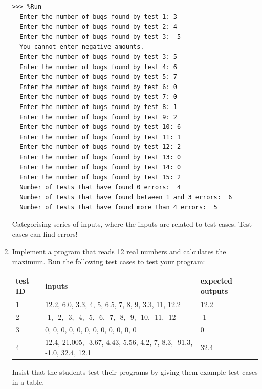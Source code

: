 \documentclass[
  fontsize=10pt,
  a4paper,
]{scrartcl}
\newenvironment{domainTILEd}%
  {\begin{mdframed}[skipabove=10pt,skipbelow=10pt,backgroundcolor=green!20]}%
  {\end{mdframed}}
\newenvironment{howTILEd}%
  {\begin{mdframed}[skipabove=10pt,skipbelow=10pt,backgroundcolor=pink!40]}%
  {\end{mdframed}}
\begin{document}
\begin{enumerate}
\begin{Verbatim}[frame=single, label={\em examples of test executions}]
>>> %Run 
  Enter the number of bugs found by test 1: 3
  Enter the number of bugs found by test 2: 4
  Enter the number of bugs found by test 3: -5
  You cannot enter negative amounts.
  Enter the number of bugs found by test 3: 5
  Enter the number of bugs found by test 4: 6 
  Enter the number of bugs found by test 5: 7
  Enter the number of bugs found by test 6: 0
  Enter the number of bugs found by test 7: 0
  Enter the number of bugs found by test 8: 1
  Enter the number of bugs found by test 9: 2
  Enter the number of bugs found by test 10: 6
  Enter the number of bugs found by test 11: 1
  Enter the number of bugs found by test 12: 2
  Enter the number of bugs found by test 13: 0
  Enter the number of bugs found by test 14: 0
  Enter the number of bugs found by test 15: 2
  Number of tests that have found 0 errors:  4
  Number of tests that have found between 1 and 3 errors:  6
  Number of tests that have found more than 4 errors:  5
\end{Verbatim} 

\begin{domainTILEd}
Categorising series of inputs, where the inputs are related to test cases. Test cases can find errors!
\end{domainTILEd}

\item Implement a program that reads 12 real numbers and calculates the maximum. Run the following test cases to test your program:

\begin{tabular}{|l|l|l|}
\hline
test ID  & inputs & expected outputs  \\ 
\hline\hline
1 & 12.2, 6.0, 3.3, 4, 5, 6.5, 7, 8, 9, 3.3, 11, 12.2  &  12.2   \\
2 & -1, -2, -3, -4, -5, -6, -7, -8, -9, -10, -11, -12  &  -1   \\
3 & 0, 0, 0, 0, 0, 0, 0, 0, 0, 0, 0, 0 & 0  \\
4 & 12.4, 21.005, -3.67, 4.43, 5.56, 4.2, 7, 8.3, -91.3, -1.0, 32.4, 12.1 & 32.4 \\
\hline
\end{tabular}

\begin{howTILEd}
Insist that the students test their programs by giving them example test cases in a table.
\end{howTILEd}





\end{enumerate}
\end{document}
